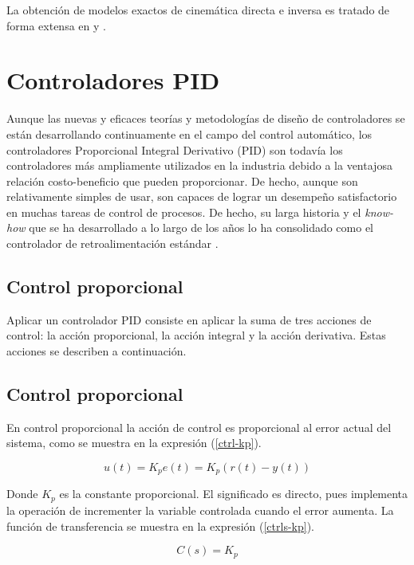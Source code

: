 La obtención de modelos exactos de cinemática directa e inversa es tratado de forma extensa en \cite{cole2007} y \cite{predescu2015}.

\section{Controladores PID}

Aunque las nuevas y eficaces teorías y metodologías de diseño de controladores se están desarrollando continuamente en el campo del control automático, los controladores Proporcional Integral Derivativo (PID) son todavía los controladores más ampliamente utilizados en la industria debido a la ventajosa relación costo-beneficio que pueden proporcionar. De hecho, aunque son relativamente simples de usar, son capaces de lograr un desempeño satisfactorio en muchas tareas de control de procesos. De hecho, su larga historia y el \textit{know-how} que se ha desarrollado a lo largo de los años lo ha consolidado como el controlador de retroalimentación estándar \cite{practical_pid}.

\subsection{Control proporcional}

Aplicar un controlador PID consiste en aplicar la suma de tres acciones de control: la acción proporcional, la acción integral y la acción derivativa. Estas acciones se describen a continuación.

\subsection{Control proporcional}
En control proporcional la acción de control es proporcional al error actual del sistema, como se muestra en la expresión (\ref{ctrl-kp}).

\begin{equation}\label{ctrl-kp}
u(t) = K_p e(t) = K_p(r(t)-y(t))
\end{equation}

Donde $K_p$ es la constante proporcional. El significado es directo, pues implementa la operación de incrementer la variable controlada cuando el error aumenta. La función de transferencia se muestra en la expresión (\ref{ctrls-kp}).

\begin{equation}\label{ctrls-kp}
C(s) = K_p
\end{equation}


